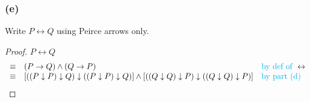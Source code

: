 \documentclass[14pt]{extarticle}
\newcommand{\bic}{\leftrightarrow}
\begin{document}
\subsubsection{(e)}
Write $P \bic Q$ using Peirce arrows only.

\begin{proof}
$P \bic Q$
$$
\begin{array}{cll}
\equiv & (P \to Q) \wedge (Q \to P) & \text{\color{cyan}by def of } \bic \\
\equiv & [((P \downarrow P) \downarrow Q) \downarrow ((P \downarrow P) \downarrow Q)] \wedge [((Q \downarrow Q) \downarrow P) \downarrow ((Q \downarrow Q) \downarrow P)] & \text{\color{cyan}by part (d)} \\
\end{array}
$$
\end{proof}
\end{document}
